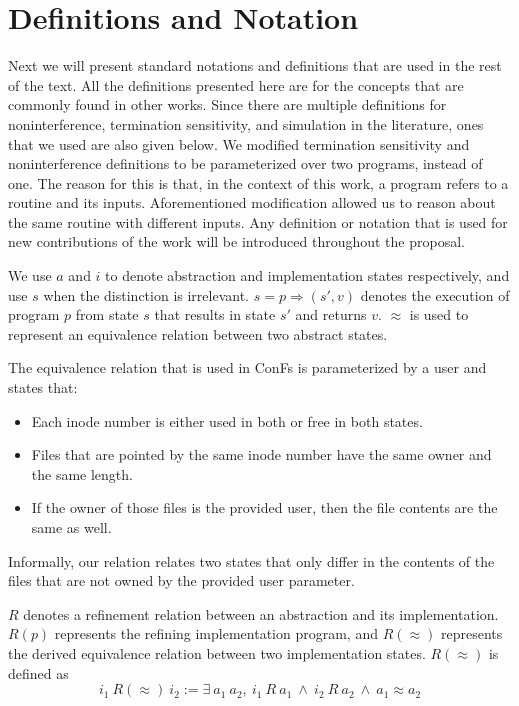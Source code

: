 \section{Definitions and Notation}
Next we will present standard notations and definitions that are used in the rest of the text. All the definitions presented here are for the concepts that are commonly found in other works. Since there are multiple definitions for noninterference, termination sensitivity, and simulation in the literature, ones that we used are also given below. We modified termination sensitivity and noninterference definitions to be parameterized over two programs, instead of one. The reason for this is that, in the context of this work, a program refers to a routine and its inputs. Aforementioned modification allowed us to reason about the same routine with different inputs. Any definition or notation that is used for new contributions of the work will be introduced throughout the proposal.

We use $a$ and $i$ to denote abstraction and implementation states respectively, and use $s$ when the distinction is irrelevant.
$s =p\Rightarrow (s', v)$ denotes the execution of program $p$ from state $s$ that results in state $s'$ and returns $v$. $\approx$ is used to represent an equivalence relation between two abstract states. 

The equivalence relation that is used in ConFs is parameterized by a user and states that: 
\begin{itemize}
	\item Each inode number is either used in both or free in both states.
	\item Files that are pointed by the same inode number have the same owner and the same length. 
	\item If the owner of those files is the provided user, then the file contents are the same as well.
\end{itemize}

Informally, our relation relates two states that only differ in the contents of the files that are not owned by the provided user parameter. 

$R$ denotes a refinement relation between an abstraction and its implementation. $R(p)$ represents the refining implementation program, and $R(\approx)$ represents the derived equivalence relation between two implementation states. $R(\approx)$ is defined as 
$$
i_1\ R(\approx)\ i_2 := \exists\ a_1\ a_2,\ i_1\ R\ a_1\ \wedge\ i_2\ R\ a_2\ \wedge\ a_1 \approx a_2
$$


